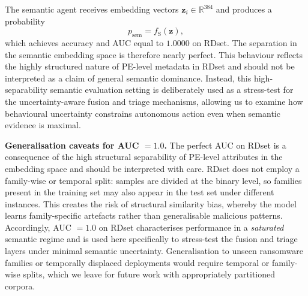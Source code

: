 \documentclass[lettersize,journal]{IEEEtran}
\begin{document}
The semantic agent receives embedding vectors \(\mathbf{z}_i \in \mathbb{R}^{384}\) and produces a probability
\begin{equation}
p_{\mathrm{sem}} = f_{\mathrm{S}}(\mathbf{z}),
\label{eq:psem}
\end{equation}
which achieves accuracy and AUC equal to \(1.0000\) on RDset. The separation in the semantic embedding space is therefore nearly perfect. This behaviour reflects the highly structured nature of PE-level metadata in RDset and should not be interpreted as a claim of general semantic dominance. Instead, this high-separability semantic evaluation setting is deliberately used as a stress-test for the uncertainty-aware fusion and triage mechanisms, allowing us to examine how behavioural uncertainty constrains autonomous action even when semantic evidence is maximal.


\cbstart
\noindent\textbf{Generalisation caveats for AUC $= 1.0$.}
The perfect AUC on RDset
\cbend
 is a consequence of the high structural separability of PE-level
attributes in the embedding space and should be interpreted with care. RDset does not employ
a family-wise or temporal split: samples are divided at the binary level, so families present
in the training set may also appear in the test set under different instances. This creates
the risk of structural similarity bias, whereby the model learns family-specific artefacts
rather than generalisable malicious patterns. Accordingly, AUC $= 1.0$ on RDset characterises
performance in a \emph{saturated} semantic regime and is used here specifically to stress-test
the fusion and triage layers under minimal semantic uncertainty. 
\cbstart
Generalisation to unseen
ransomware families or temporally displaced deployments would require temporal or family-wise
splits, which we leave for future work with appropriately partitioned corpora.
\cbend
\end{document}

